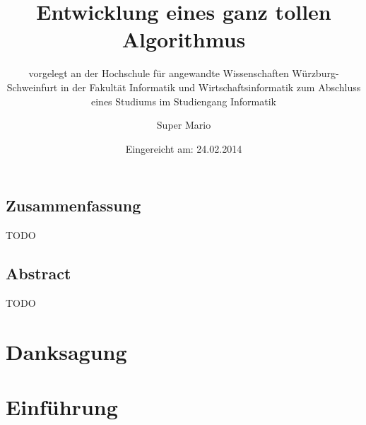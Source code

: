 \documentclass[12pt,oneside,a4paper,parskip]{scrbook}
\def\BaAuthor{Super Mario}
\def\BaTitle{Entwicklung eines ganz tollen Algorithmus}
\def\BaSupervisorOne{Prof.\ Dr.\ Peter Braun}
\def\BaSupervisorTwo{Prof.\ Dr.\ XX YY}
\def\BaDeadline{24.02.2014}
\begin{document}


\frontmatter
\titlehead{%
  {Hochschule für angewandte Wissenschaften Würzburg-Schweinfurt\\
   Fakultät Informatik und Wirtschaftsinformatik}}
\subject{Bachelorarbeit}
\title{\BaTitle\\[15mm]}
\subtitle{\normalsize{vorgelegt an der Hochschule f\"{u}r angewandte Wissenschaften W\"{u}rzburg-Schweinfurt in der Fakult\"{a}t Informatik und Wirtschaftsinformatik zum Abschluss eines Studiums im Studiengang Informatik}}
\author{\BaAuthor}
\date{\normalsize{Eingereicht am: \BaDeadline}}
\publishers{
  \normalsize{Erstpr\"{u}fer: \BaSupervisorOne}\\
  \normalsize{Zweitpr\"{u}fer: \BaSupervisorTwo}\\
}


\maketitle



\section*{Zusammenfassung}

TODO

\section*{Abstract}

TODO

\newpage
\chapter*{Danksagung}



\tableofcontents										



\mainmatter

\chapter{Einführung}\label{ch:intro}
\end{document}
